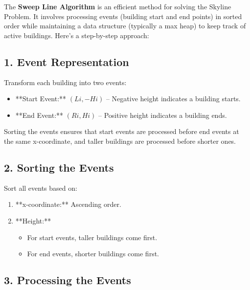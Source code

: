 The \textbf{Sweep Line Algorithm} is an efficient method for solving the Skyline Problem. It involves processing events (building start and end points) in sorted order while maintaining a data structure (typically a max heap) to keep track of active buildings. Here's a step-by-step approach:

\subsection*{1. Event Representation}

Transform each building into two events:
\begin{itemize}
    \item **Start Event:** \((Li, -Hi)\) – Negative height indicates a building starts.
    \item **End Event:** \((Ri, Hi)\) – Positive height indicates a building ends.
\end{itemize}

Sorting the events ensures that start events are processed before end events at the same x-coordinate, and taller buildings are processed before shorter ones.

\subsection*{2. Sorting the Events}

Sort all events based on:
\begin{enumerate}
    \item **x-coordinate:** Ascending order.
    \item **Height:**
    \begin{itemize}
        \item For start events, taller buildings come first.
        \item For end events, shorter buildings come first.
    \end{itemize}
\end{enumerate}

\subsection*{3. Processing the Events}

